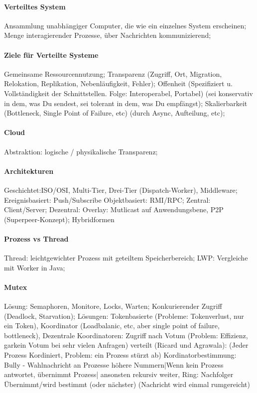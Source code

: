 \documentclass[pagesize,11pt,a4paper]{scrartcl}
\begin{document}
\paragraph*{Verteiltes System}
	Ansammlung unabhängiger Computer, die wie ein einzelnes System erscheinen; 
	Menge interagierender Prozesse, über Nachrichten kommunizierend;

\paragraph*{Ziele für Verteilte Systeme}
	Gemeinsame Ressourcennutzung;
	Transparenz (Zugriff, Ort, Migration, Relokation, Replikation, Nebenläufigkeit, Fehler);
	Offenheit (Spezifiziert u. Vollständigkeit der Schnittstellen. Folge: Interoperabel, Portabel) (sei konservativ in dem, was Du sendest, sei tolerant in dem, was Du empfängst);
	Skalierbarkeit (Bottleneck, Single Point of Failure, etc) (durch Async, Aufteilung, etc);
	
\paragraph*{Cloud}
	Abstraktion: logische / physikalische Transparenz; 

\paragraph{Architekturen}
	Geschichtet:ISO/OSI, Multi-Tier, Drei-Tier (Dispatch-Worker), Middleware;
	Ereignisbasiert: Push/Subscribe
	Objektbasiert: RMI/RPC;
	Zentral: Client/Server;
	Dezentral: Overlay: Mutlicast auf Anwendungsbene, P2P (Superpeer-Konzept);
	Hybridformen
	
\paragraph{Prozess vs Thread}
	Thread: leichtgewichter Prozess mit geteiltem Speicherbereich;
	LWP: Vergleiche mit Worker in Java;

\paragraph*{Mutex}
	Lösung: Semaphoren, Monitore, Locks, Warten;
	Konkurierender Zugriff (Deadlock, Starvation);
	Lösungen: 
		Tokenbasierte (Probleme: Tokenverlust, nur ein Token), 
		Koordinator (Loadbalanic, etc, aber single point of failure, bottleneck),
		Dezentrale Koordinatoren: Zugriff nach Votum (Problem: Effizienz, garkein Votum bei sehr vielen Anfragen)
		verteilt (Ricard und Agrawala): (Jeder Prozess Kordiniert, Problem: ein Prozess stürzt ab)  
 		Kordinatorbestimmung: 
			Bully - Wahlnachricht an Prozesse höhere Nummern|Wenn kein Prozess antwortet, übernimmt Prozess| ansonsten rekursiv weiter,
			Ring: Nachfolger Übernimmt/wird bestimmt (oder nächster) (Nachricht wird einmal rumgereicht)
\end{document}
